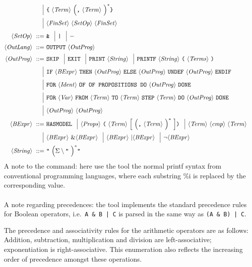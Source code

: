 \documentclass[twoside]{article}
\begin{document}
\begin{align*}
                \altn & \term{\{} \nonterm{Term} \group{\term{,} \nonterm{Term}}^* \term{\}} \\
                \altn & \nonterm{FinSet} \nonterm{SetOp} \nonterm{FinSet} \\
\nonterm{SetOp} ::=\ & \term{\&} \altn \term{|} \altn{-} \\
\nonterm{OutLang} ::=\ & \term{OUTPUT} \nonterm{OutProg} \\
\nonterm{OutProg} ::=\ & \term{SKIP} 
          \altn \term{EXIT}
          \altn \term{PRINT} \nonterm{String}
          \altn \term{PRINTF} \nonterm{String} \term{(}\nonterm{Terms}\term{)}\\
          \altn & \term{IF} \nonterm{BExpr} \term{THEN} \nonterm{OutProg} \term{ELSE} \nonterm{OutProg} \term{UNDEF} \nonterm{OutProg} \term{ENDIF}\\
          \altn & \term{FOR} \nonterm{Ident} \term{OF OF PROPOSITIONS DO} \nonterm{OutProg} \term{DONE}\\
          \altn & \term{FOR} \nonterm{Var} \term{FROM} \nonterm{Term} \term{TO} \nonterm{Term} \term{STEP} \nonterm{Term} \term{DO} \nonterm{OutProg} \term{DONE}\\
          \altn & \nonterm{OutProg} \nonterm{OutProg}\\
 \nonterm{BExpr} ::=\ & \term{HASMODEL} \altn \nonterm{Props}\term{(} \nonterm{Term} \optional{ \group{\term{,} \nonterm{Term}}^* } \term{)}\altn \nonterm{Term} \nonterm{cmp} \nonterm{Term}\\
    \altn & \nonterm{BExpr} \& \nonterm{BExpr} \altn \nonterm{BExpr} | \nonterm{BExpr} \altn \neg \nonterm{BExpr} \\
\nonterm{String} ::=\ & \term{"} \group{\Sigma \setminus \term{"}}^* \term{"}
\end{align*}
A note to the  command: here use the \DiMo tool the normal printf syntax from conventional programming languages, where each substring \%i is replaced by the corresponding  value.\\
\ \\
A note regarding precedences: the \DiMo tool implements the standard precedence rules for Boolean operators, i.e.\ \texttt{A \& B | C} is parsed in the same way as
\texttt{(A \& B) | C}. 

The precedence and associativity rules for the arithmetic operators are as follows: Addition, subtraction, multiplication and division are left-associative; exponentiation is 
right-associative. This enumeration also reflects the increasing order of precedence amongst these operations.
\end{document}
